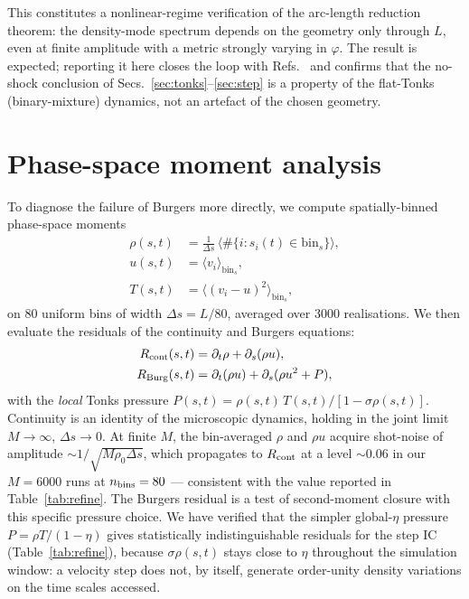 \documentclass[aps,pre,twocolumn,superscriptaddress,longbibliography,floatfix]{revtex4-2}
\begin{document}
This constitutes a nonlinear-regime verification of the
arc-length reduction theorem: the density-mode spectrum
depends on the geometry only through $L$, even at finite
amplitude with a metric strongly varying in $\varphi$.
The result is expected; reporting it here closes the loop with
Refs.~\cite{PaperI,PaperII} and confirms that the no-shock
conclusion of Secs.~\ref{sec:tonks}--\ref{sec:step} is a property
of the flat-Tonks (binary-mixture) dynamics, not an artefact
of the chosen geometry.

\section{Phase-space moment analysis}
\label{sec:phase}

To diagnose the failure of Burgers more directly, we compute
spatially-binned phase-space moments
\begin{align}
\rho(s,t) &= \frac{1}{\Delta s}\,\langle\#\{i:s_i(t)\in
\mathrm{bin}_s\}\rangle, \\
u(s,t) &= \langle v_i\rangle_{\mathrm{bin}_s}, \\
T(s,t) &= \langle (v_i - u)^2\rangle_{\mathrm{bin}_s},
\end{align}
on $80$ uniform bins of width $\Delta s = L/80$, averaged over
$3000$ realisations. We then evaluate the residuals of the
continuity and Burgers equations:
\begin{align}
R_{\rm cont}(s,t)&=\partial_t \rho + \partial_s (\rho u),\\
R_{\rm Burg}(s,t)&=\partial_t (\rho u) + \partial_s (\rho u^2 + P),
\end{align}
with the \emph{local} Tonks pressure
$P(s,t) = \rho(s,t)\,T(s,t) /[1-\sigma\rho(s,t)]$. Continuity is an identity of the microscopic dynamics, holding
in the joint limit $M\to\infty$, $\Delta s\to 0$. At finite
$M$, the bin-averaged $\rho$ and $\rho u$ acquire shot-noise of
amplitude $\sim 1/\sqrt{M \rho_0 \Delta s}$, which propagates to
$R_{\rm cont}$ at a level $\sim 0.06$ in our $M=6000$ runs at
$n_{\rm bins}=80$ --- consistent with the value reported in
Table~\ref{tab:refine}. The Burgers residual is a test of
second-moment closure with this specific pressure choice. We have verified that the simpler global-$\eta$ pressure
$P=\rho T/(1-\eta)$ gives statistically indistinguishable
residuals for the step IC (Table~\ref{tab:refine}), because
$\sigma\rho(s,t)$ stays close to $\eta$ throughout the
simulation window: a velocity step does not, by itself, generate
order-unity density variations on the time scales accessed.
\end{document}
